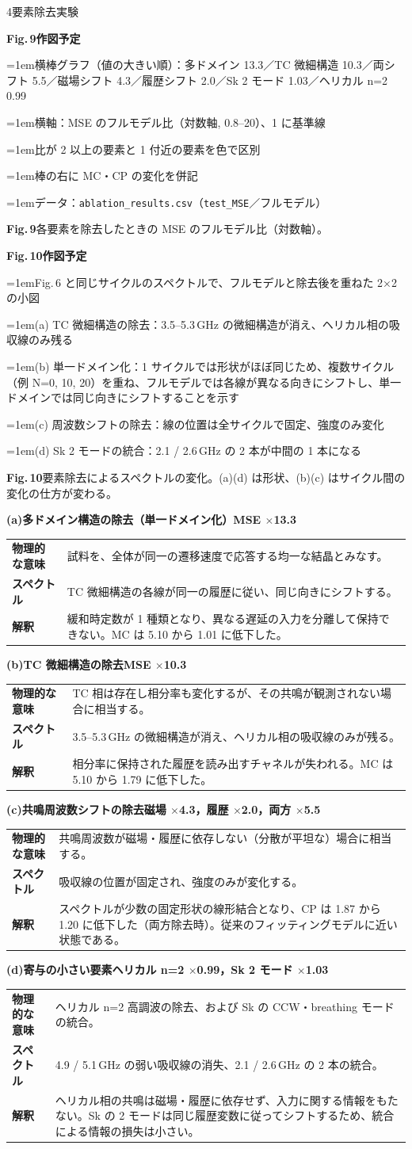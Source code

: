 \documentclass{article}
\makeatletter
\newif\iffignotes \fignotestrue
\newcommand\rTC{10.3}     %
\newcommand\rNtwo{0.99}   %
\newcommand\rSplit{1.03}  %
\newcommand\rHist{2.0}    %
\newcommand\rField{4.3}   %
\newcommand\rBoth{5.5}    %
\newcommand\rMD{13.3}     %
\newcommand\MCfull{5.10}
\newcommand\CPfull{1.87}
\newcommand\MCnoMD{1.01}
\newcommand\MCnoTC{1.79}
\newcommand\CPnoBoth{1.20}
\newcommand\smallfont{\fontsize{17.5}{25}\selectfont}
\newcommand\capfont{\fontsize{16}{22.5}\selectfont}
\newcommand\notefont{\fontsize{12.5}{17.5}\selectfont}
\newcommand\tms{\ensuremath{\times}}
\newcommand\nitem{\par\hangindent=1em\hangafter=1\makebox[1em][l]{\textbullet}}
\newcommand{\figph}[4]{%
  \begin{tcolorbox}[enhanced, frame hidden, colback=cGray!7,
    borderline={1.8pt}{0pt}{cGray!70,dashed}, arc=2mm, height from=#1 to 1000mm,
    left=5mm,right=5mm,top=4mm,bottom=4mm]
    {\fontsize{19}{24}\selectfont\bfseries\color{cGray}#2\quad\fontsize{14}{18}\selectfont 作図予定}\par\vspace{1.5mm}
    \iffignotes{\notefont\color{black!75}#3\par}\fi
  \end{tcolorbox}\par\vspace{2mm}
  {\capfont\textbf{#2}\enspace #4\par}}
\newcommand\ablitem[5]{\par\vspace{3mm}%
  {\fontsize{22.5}{30}\selectfont\bfseries\color{cMain}#1\hfill #2\par}\vspace{1mm}
  {\smallfont
  \begin{tabular}{@{}>{\bfseries}p{7.2em}@{}p{\dimexpr\linewidth-7.2em\relax}@{}}
  物理的な意味 & #3\\[0.6mm]
  スペクトル   & #4\\[0.6mm]
  解釈         & #5
  \end{tabular}\par}}
\newlength\gap   \setlength\gap{11mm}
\newlength\halfw \setlength\halfw{\dimexpr(\textwidth-\gap)/2\relax}
\makeatother
\begin{document}
\begin{minipage}[t]{\halfw}
\begin{secbox}{4\enspace 要素除去実験}
\begin{minipage}[t]{0.485\linewidth}\vspace{0pt}
\figph{118mm}{Fig.\,9}{%
\nitem 横棒グラフ（値の大きい順）：多ドメイン \rMD{}／TC 微細構造 \rTC{}／両シフト \rBoth{}／磁場シフト \rField{}／履歴シフト \rHist{}／Sk 2 モード \rSplit{}／ヘリカル n=2 \rNtwo{}
\nitem 横軸：MSE のフルモデル比（対数軸, 0.8–20）、1 に基準線
\nitem 比が 2 以上の要素と 1 付近の要素を色で区別
\nitem 棒の右に MC・CP の変化を併記
\nitem データ：\texttt{ablation\_results.csv}（\texttt{test\_MSE}／フルモデル）
}{各要素を除去したときの MSE のフルモデル比（対数軸）。}
\end{minipage}\hfill
\begin{minipage}[t]{0.485\linewidth}\vspace{0pt}
\figph{118mm}{Fig.\,10}{%
\nitem Fig.\,6 と同じサイクルのスペクトルで、フルモデルと除去後を重ねた 2×2 の小図
\nitem (a) TC 微細構造の除去：3.5–5.3\,GHz の微細構造が消え、ヘリカル相の吸収線のみ残る
\nitem (b) 単一ドメイン化：1 サイクルでは形状がほぼ同じため、複数サイクル（例 N=0, 10, 20）を重ね、フルモデルでは各線が異なる向きにシフトし、単一ドメインでは同じ向きにシフトすることを示す
\nitem (c) 周波数シフトの除去：線の位置は全サイクルで固定、強度のみ変化
\nitem (d) Sk 2 モードの統合：2.1 / 2.6\,GHz の 2 本が中間の 1 本になる
}{要素除去によるスペクトルの変化。(a)(d) は形状、(b)(c) はサイクル間の変化の仕方が変わる。}
\end{minipage}
\vspace{2mm}

\ablitem{(a)\enspace 多ドメイン構造の除去（単一ドメイン化）}{MSE \tms\rMD}
  {試料を、全体が同一の遷移速度で応答する均一な結晶とみなす。}
  {TC 微細構造の各線が同一の履歴に従い、同じ向きにシフトする。}
  {緩和時定数が 1 種類となり、異なる遅延の入力を分離して保持できない。MC は \MCfull{} から \MCnoMD{} に低下した。}
\ablitem{(b)\enspace TC 微細構造の除去}{MSE \tms\rTC}
  {TC 相は存在し相分率も変化するが、その共鳴が観測されない場合に相当する。}
  {3.5–5.3\,GHz の微細構造が消え、ヘリカル相の吸収線のみが残る。}
  {相分率に保持された履歴を読み出すチャネルが失われる。MC は \MCfull{} から \MCnoTC{} に低下した。}
\ablitem{(c)\enspace 共鳴周波数シフトの除去}{磁場 \tms\rField{}，履歴 \tms\rHist{}，両方 \tms\rBoth}
  {共鳴周波数が磁場・履歴に依存しない（分散が平坦な）場合に相当する。}
  {吸収線の位置が固定され、強度のみが変化する。}
  {スペクトルが少数の固定形状の線形結合となり、CP は \CPfull{} から \CPnoBoth{} に低下した（両方除去時）。従来のフィッティングモデルに近い状態である。}
\ablitem{(d)\enspace 寄与の小さい要素}{ヘリカル n=2 \tms\rNtwo{}，Sk 2 モード \tms\rSplit}
  {ヘリカル n=2 高調波の除去、および Sk の CCW・breathing モードの統合。}
  {4.9 / 5.1\,GHz の弱い吸収線の消失、2.1 / 2.6\,GHz の 2 本の統合。}
  {ヘリカル相の共鳴は磁場・履歴に依存せず、入力に関する情報をもたない。Sk の 2 モードは同じ履歴変数に従ってシフトするため、統合による情報の損失は小さい。}


\end{secbox}
\end{minipage}
\end{document}
